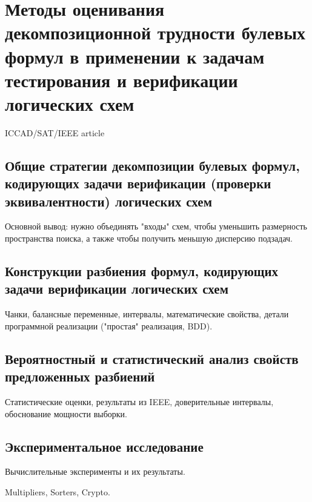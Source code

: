 \chapter{Методы оценивания декомпозиционной трудности булевых формул в применении к задачам тестирования и верификации логических схем}
\label{ch:decompositions}

ICCAD/SAT/IEEE article

\section{Общие стратегии декомпозиции булевых формул, кодирующих задачи верификации (проверки эквивалентности) логических схем}

Основной вывод: нужно объединять "входы" схем, чтобы уменьшить размерность пространства поиска, а также чтобы получить меньшую дисперсию подзадач.

\section{Конструкции разбиения формул, кодирующих задачи верификации логических схем}

Чанки, балансные переменные, интервалы, математические свойства, детали программной реализации ("простая" реализация, BDD).

\section{Вероятностный и статистический анализ свойств предложенных разбиений}

Статистические оценки, результаты из IEEE, доверительные интервалы, обоснование мощности выборки.

\section{Экспериментальное исследование}

Вычислительные эксперименты и их результаты.

Multipliers, Sorters, Crypto.
